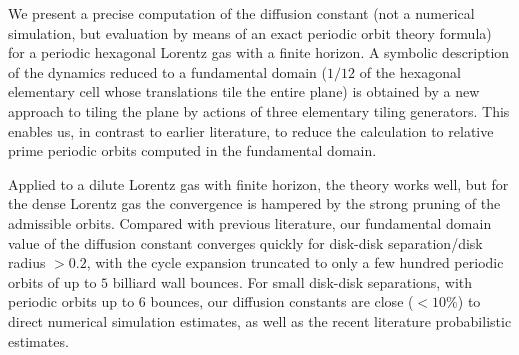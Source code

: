 
We present a precise computation of the diffusion constant (not a numerical
simulation, but evaluation by means of an exact periodic orbit theory formula)
for a periodic hexagonal Lorentz gas with a finite horizon. A symbolic
description of the dynamics reduced to a fundamental domain ($1/12$ of the
hexagonal elementary cell whose translations tile the entire plane) is obtained
by a new approach to tiling the plane by actions of three elementary tiling
generators. This enables us, in contrast to earlier literature, to reduce the
calculation to relative prime periodic orbits computed in the fundamental domain.

Applied to a dilute Lorentz gas with finite horizon, the theory works well, but
for the dense Lorentz gas the convergence is hampered by the strong pruning of
the admissible orbits.
Compared with previous literature, our fundamental domain value of the
diffusion constant converges quickly for disk-disk separation/disk radius
$>0.2$, with the cycle expansion truncated to only a few hundred periodic
orbits of up to $5$ billiard wall bounces. For small disk-disk separations,
with periodic orbits up to $6$ bounces, our diffusion constants are close
($<10\%$) to direct numerical simulation estimates, as well as the recent
literature probabilistic estimates.
